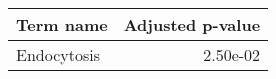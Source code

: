 \begin{tabular}{lr}
\toprule
   Term name &  Adjusted p-value \\
\midrule
 Endocytosis &          2.50e-02 \\
\bottomrule
\end{tabular}
